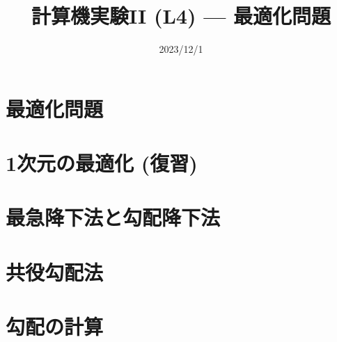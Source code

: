 \documentclass[10pt,dvipdfmx]{beamer}
\title{計算機実験II (L4) --- 最適化問題}
\date{2023/12/1}
\begin{document}
\begin{frame}
  \titlepage
  \tableofcontents
\end{frame}



\section{最適化問題}




\section{1次元の最適化 (復習)}







\section{最急降下法と勾配降下法}




\section{共役勾配法}










\section{勾配の計算}













\end{document}
